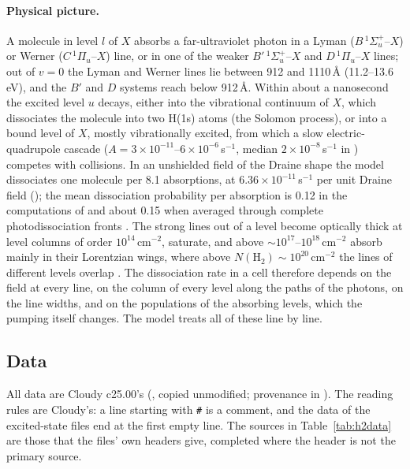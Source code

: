 \paragraph{Physical picture.} A molecule in level $l$ of $X$ absorbs a
far-ultraviolet photon in a Lyman ($B\,^1\Sigma_u^+$--$X$) or Werner
($C\,^1\Pi_u$--$X$) line, or in one of the weaker $B'\,^1\Sigma_u^+$--$X$ and
$D\,^1\Pi_u$--$X$ lines; out of $v=0$ the Lyman and Werner lines lie between 912
and 1110\,\AA{} (11.2--13.6\,eV), and the $B'$ and $D$ systems reach below
912\,\AA. Within about a nanosecond the excited level $u$ decays, either into
the vibrational continuum of $X$, which dissociates the molecule into two H(1s)
atoms (the Solomon process), or into a bound level of $X$, mostly
vibrationally excited, from which a slow electric-quadrupole cascade
($A=3\times10^{-11}$--$6\times10^{-6}$\,s$^{-1}$, median $2\times10^{-8}$\,s$^{-1}$ in
) competes with collisions. In an unshielded field of the
Draine shape the model dissociates one molecule per 8.1 absorptions, at
$6.36\times10^{-11}$\,s$^{-1}$ per unit Draine field (); the mean
dissociation probability per absorption is 0.12 in the computations of
\citet{Sternberg2014} and about 0.15 when averaged through complete
photodissociation fronts \citep{DraineBertoldi1996}. The strong lines out of a
level become optically thick at level columns of order
$10^{14}$\,cm$^{-2}$, saturate, and above $\sim10^{17}$--$10^{18}$\,cm$^{-2}$ absorb
mainly in their Lorentzian wings, where above $N(\mathrm{H_2})\sim10^{20}$\,cm$^{-2}$
the lines of different levels overlap \citep{DraineBertoldi1996}. The
dissociation rate in a cell therefore depends on the field at every line, on
the column of every level along the paths of the photons, on the line widths,
and on the populations of the absorbing levels, which the pumping itself
changes. The model treats all of these line by line.

\subsection{Data}
\label{sec:h2data}

All data are Cloudy c25.00's (, copied
unmodified; provenance in ). The
reading rules are Cloudy's: a line starting with \texttt{\#} is a comment, and the
data of the excited-state files end at the first empty line. The sources in
Table~\ref{tab:h2data} are those that the files' own headers give, completed
where the header is not the primary source.

